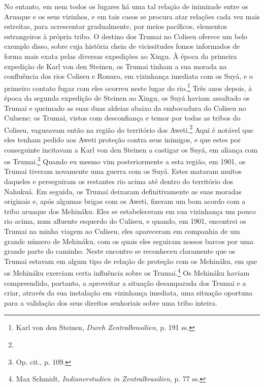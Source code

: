 No entanto, em nem todos os lugares há uma tal relação de inimizade
entre os Aruaque e os seus vizinhos, e em tais casos se procura atar
relações cada vez mais estreitas, para acrescentar gradualmente, por
meios pacíficos, elementos estrangeiros à própria tribo. O destino dos
Trumai no Coliseu oferece um belo exemplo disso, sobre cuja história
cheia de vicissitudes fomos informados de forma mais exata pelas
diversas expedições ao Xingu. À época da primeira expedição de Karl von
den Steinen, os Trumai tinham a sua morada na confluência dos rios
Coliseu e Ronuro, em vizinhança imediata com os Suyá, e o primeiro
contato fugaz com eles ocorreu neste lugar do rio.\footnote{Karl von den
  Steinen, \emph{Durch Zentralbrasilien}, p. 191 ss.} Três anos depois,
à época da segunda expedição de Steinen ao Xingu, os Suyá haviam
assaltado os Trumai e queimado as suas duas aldeias abaixo da embocadura
do Coliseu no Culuene; os Trumai, vistos com desconfiança e temor por
todas as tribos do Coliseu, vagueavam então na região do território dos
Aweti.\footnote{} Aqui é notável que
eles tenham pedido aos Aweti proteção contra seus inimigos, e que estes
por conseguinte incitavam a Karl von den Steinen a castigar os Suyá, em
aliança com os Trumai.\footnote{Op. cit., p. 109.} Quando eu mesmo vim
posteriormente a esta região, em 1901, os Trumai tiveram novamente uma
guerra com os Suyá. Estes mataram muitos daqueles e perseguiram os
restantes rio acima até dentro do território dos Nahukuá. Em seguida, os
Trumai deixaram definitivamente as suas moradas originais e, após
algumas brigas com os Aweti, fizeram um bom acordo com a tribo aruaque
dos Mehináku. Eles se estabeleceram em sua vizinhança um pouco rio
acima, num afluente esquerdo do Culiseu, e quando, em 1901, encontrei os
Trumai na minha viagem ao Culiseu, eles apareceram em companhia de um
grande número de Mehináku, com os quais eles seguiram nossos barcos por
uma grande parte do caminho. Neste encontro se reconheceu claramente
que os Trumai estavam em algum tipo de relação de proteção com os
Mehináku, em que os Mehináku exerciam certa influência sobre os
Trumai.\footnote{Max Schmidt, \emph{Indianerstudien in Zentralbrasilien},
  p. 77 ss.} Os Mehináku haviam compreendido, portanto, a aproveitar a
situação desamparada dos Trumai e a criar, através da sua instalação em
vizinhança imediata, uma situação oportuna para a validação dos seus
direitos senhoriais sobre uma tribo inteira.


